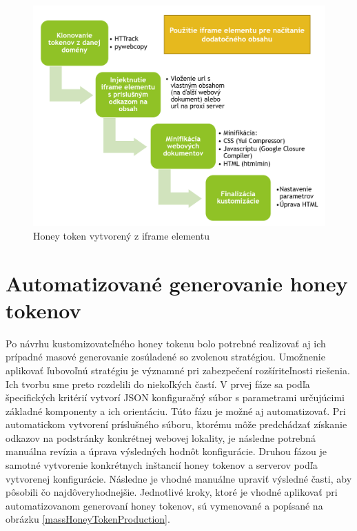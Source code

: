 \documentclass[conference, 11pt,slovak,a4paper,twoside]{IEEEtran}
\begin{document}
\begin{figure}[!t]  %
					\begin{center}
									\includegraphics[width=\linewidth]{fig/iframeToken.png}
									\caption{Honey token vytvorený z iframe elementu}
									\label{iframeToken}
					\end{center}
\end{figure}



\section{Automatizované generovanie honey tokenov} \label{automaticGeneratingOfHoneyTokens}

Po návrhu kustomizovateľného honey tokenu bolo potrebné realizovať aj ich prípadné masové generovanie zosúladené so zvolenou stratégiou. Umožnenie aplikovať ľubovoľnú stratégiu je významné pri zabezpečení rozšíriteľnosti riešenia. Ich tvorbu sme preto rozdelili do niekoľkých častí. V prvej fáze sa podľa špecifických kritérií vytvorí JSON konfiguračný súbor s parametrami určujúcimi základné komponenty a ich orientáciu. Túto fázu je možné aj automatizovať. Pri automatickom vytvorení príslušného súboru, ktorému môže predchádzať získanie odkazov na podstránky konkrétnej webovej lokality, je následne potrebná manuálna revízia a úprava výsledných hodnôt konfigurácie. Druhou fázou je samotné vytvorenie konkrétnych inštancií honey tokenov a serverov podľa vytvorenej konfigurácie. Následne je vhodné manuálne upraviť výsledné časti, aby pôsobili čo najdôveryhodnejšie. Jednotlivé kroky, ktoré je vhodné aplikovať pri automatizovanom generovaní honey tokenov, sú vymenované a popísané na obrázku \ref{massHoneyTokenProduction}.
\end{document}
